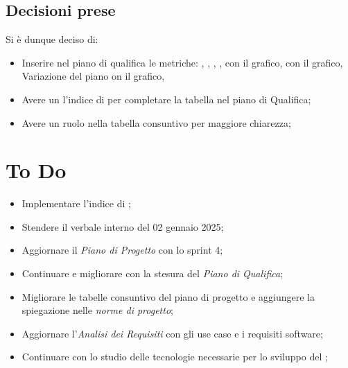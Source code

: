 \documentclass[a4paper, 12pt]{article}
\begin{document}
\subsection{Decisioni prese}
Si è dunque deciso di:
\begin{itemize}
    \item Inserire nel piano di qualifica le metriche:
    , 
    ,
    ,
    ,
     con il grafico,
     con il grafico,
    Variazione del piano on il grafico,
    \item Avere un l'indice di  per completare la tabella nel piano di Qualifica;
    \item Avere un ruolo nella tabella consuntivo per maggiore chiarezza;
    
\end{itemize}
\section{To Do}
\begin{itemize}
    \item Implementare l'indice di ;
    \item Stendere il verbale interno del 02 gennaio 2025;
    \item Aggiornare il \textit{Piano di Progetto} con lo sprint 4;
    \item Continuare e migliorare con la stesura del \textit{Piano di Qualifica};
    \item Migliorare le tabelle consuntivo del piano di progetto e aggiungere la spiegazione nelle \textit{norme di progetto};
    \item Aggiornare l'\textit{Analisi dei Requisiti} con gli use case e i requisiti software;
    \item Continuare con lo studio delle tecnologie necessarie per lo sviluppo del ;
\end{itemize}
\end{document}
